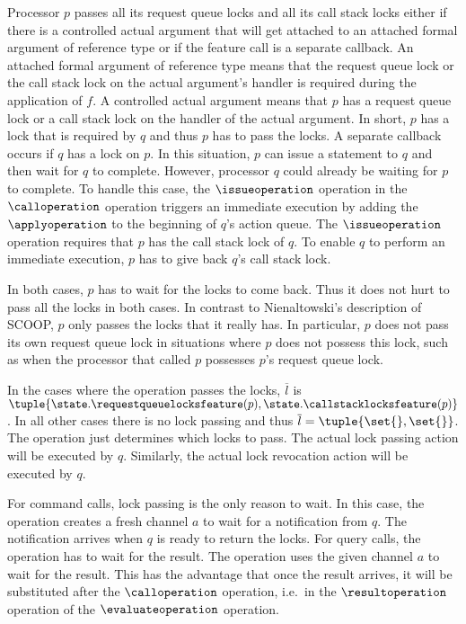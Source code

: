 \begin{clarification}
Processor $p$ passes all its request queue locks and all its call stack locks either if there is a controlled actual argument that will get attached to an attached formal argument of reference type or if the feature call is a separate callback. An attached formal argument of reference type means that the request queue lock or the call stack lock on the actual argument's handler is required during the application of $f$. A controlled actual argument means that $p$ has a request queue lock or a call stack lock on the handler of the actual argument. In short, $p$ has a lock that is required by $q$ and thus $p$ has to pass the locks. A separate callback occurs if $q$ has a lock on $p$. In this situation, $p$ can issue a statement to $q$ and then wait for $q$ to complete. However, processor $q$ could already be waiting for $p$ to complete. To handle this case, the $\issueoperation$ operation in the $\calloperation$ operation triggers an immediate execution by adding the $\applyoperation$ to the beginning of $q$'s action queue. The $\issueoperation$ operation requires that $p$ has the call stack lock of $q$. To enable $q$ to perform an immediate execution, $p$ has to give back $q$'s call stack lock.

In both cases, $p$ has to wait for the locks to come back. Thus it does not hurt to pass all the locks in both cases. In contrast to Nienaltowski's \cite{nienaltowski:2007:SCOOP} description of SCOOP, $p$ only passes the locks that it really has. In particular, $p$ does not pass its own request queue lock in situations where $p$ does not possess this lock, such as when the processor that called $p$ possesses $p$'s request queue lock.
\end{clarification}

In the cases where the operation passes the locks, $\overline{l}$ is $\tuple{\state.\requestqueuelocksfeature(p), \state.\callstacklocksfeature(p)}$. In all other cases there is no lock passing and thus $\overline{l} = \tuple{\set{}, \set{}}$. The operation just determines which locks to pass. The actual lock passing action will be executed by $q$. Similarly, the actual lock revocation action will be executed by $q$.

For command calls, lock passing is the only reason to wait. In this case, the operation creates a fresh channel $a$ to wait for a notification from $q$. The notification arrives when $q$ is ready to return the locks. For query calls, the operation has to wait for the result. The operation uses the given channel $a$ to wait for the result. This has the advantage that once the result arrives, it will be substituted after the $\calloperation$ operation, i.e.\ in the $\resultoperation$ operation of the $\evaluateoperation$ operation.

